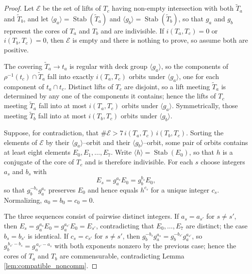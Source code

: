 \documentclass[12pt,a4paper]{amsart}
\numberwithin{equation}{section}
\theoremstyle{plain}
\theoremstyle{definition}
\theoremstyle{remark}
\begin{document}
\begin{proof}
    Let $\mathcal{E}$ be the set of lifts of $T_c$ having non-empty intersection with both $\tilde T_a$ and $\tilde T_b$, and let $\langle g_a \rangle = \operatorname{Stab}(\tilde T_a)$ and $\langle g_b \rangle = \operatorname{Stab}(\tilde T_b)$, so that $g_a$ and $g_b$ represent the cores of $T_a$ and $T_b$ and are indivisible.
    If $i(T_a, T_c) = 0$ or $i(T_b, T_c) = 0$, then $\mathcal{E}$ is empty and there is nothing to prove, so assume both are positive.

    The covering $\tilde T_a \to t_a$ is regular with deck group $\langle g_a \rangle$, so the components of $\rho^{-1}(t_c) \cap \tilde T_a$ fall into exactly $i(T_a, T_c)$ orbits under $\langle g_a \rangle$, one for each component of $t_a \cap t_c$.
    Distinct lifts of $T_c$ are disjoint, so a lift meeting $\tilde T_a$ is determined by any one of the components it contains; hence the lifts of $T_c$ meeting $\tilde T_a$ fall into at most $i(T_a, T_c)$ orbits under $\langle g_a \rangle$.
    Symmetrically, those meeting $\tilde T_b$ fall into at most $i(T_b, T_c)$ orbits under $\langle g_b \rangle$.

    Suppose, for contradiction, that $\# \mathcal{E} > 7 \, i(T_a, T_c) \, i(T_b, T_c)$.
    Sorting the elements of $\mathcal{E}$ by their $\langle g_a \rangle$--orbit and their $\langle g_b \rangle$--orbit, some pair of orbits contains at least eight elements $E_0, E_1, \ldots, E_7$.
    Write $\langle h \rangle = \operatorname{Stab}(E_0)$, so that $h$ is a conjugate of the core of $T_c$ and is therefore indivisible.
    For each $s$ choose integers $a_s$ and $b_s$ with
    \[
        E_s = g_a^{a_s} E_0 = g_b^{b_s} E_0 ,
    \]
    so that $g_b^{-b_s} g_a^{a_s}$ preserves $E_0$ and hence equals $h^{c_s}$ for a unique integer $c_s$.
    Normalizing, $a_0 = b_0 = c_0 = 0$.

    The three sequences consist of pairwise distinct integers.
    If $a_s = a_{s'}$ for $s \ne s'$, then $E_s = g_a^{a_s} E_0 = g_a^{a_{s'}} E_0 = E_{s'}$, contradicting that $E_0, \ldots, E_7$ are distinct; the case $b_s = b_{s'}$ is identical.
    If $c_s = c_{s'}$ for $s \ne s'$, then $g_b^{-b_s} g_a^{a_s} = g_b^{-b_{s'}} g_a^{a_{s'}}$, so $g_b^{\,b_{s'} - b_s} = g_a^{\,a_{s'} - a_s}$ with both exponents nonzero by the previous case; hence the cores of $T_a$ and $T_b$ are commensurable, contradicting Lemma \ref{lem:compatible_noncomm}.


\end{proof}
\end{document}
